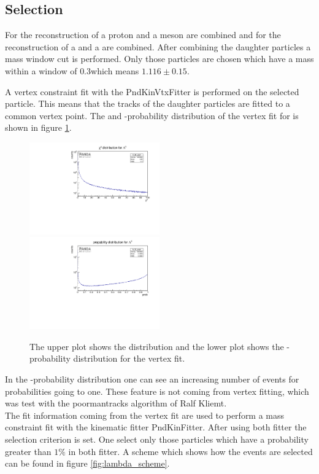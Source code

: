 	\subsection*{Selection}
		For the reconstruction of \lam a proton and a \piminus meson are combined and for the reconstruction of \alam a \antiproton and a \piplus are combined.		 
		After combining the daughter particles a mass window cut is performed.
		Only those particles are chosen which have a mass within a window of $0.3$\massunit which means $1.116\pm 0.15$\massunit.
		
		
		A vertex constraint fit with the PndKinVtxFitter is performed on the selected particle.
		This means that the tracks of the daughter particles are fitted to a common vertex point.  
		The \chisq and \chisq-probability distribution of the vertex fit for \lam is shown in figure \ref{fig:lambda_chi2}.
		
		\begin{figure}
			\centering
				\includegraphics[width=0.50\textwidth]{./plots/lambda0/lambda0_chi2.pdf}
				\includegraphics [width=0.50\textwidth]{./plots/lambda0/lambda0_prob.pdf}
			\caption{\propose The upper plot shows the  \chisq distribution and the lower plot shows the \chisq-probability distribution for the \lam vertex fit.}
			\label{fig:lambda_chi2}
		\end{figure}
		
		In the \chisq-probability distribution one can see an increasing number of events for probabilities going to one.
		These feature is not coming from vertex fitting, which was test with the poormantracks algorithm of Ralf Kliemt. 
		\vspace{11pt}\\
		The fit information coming from the vertex fit are used to perform a mass constraint fit with the kinematic fitter PndKinFitter.
		After using both fitter the selection criterion is set. 
		One select only those particles which have a probability greater than $1\%$ in both fitter.
		A scheme which shows how the events are selected can be found in figure \ref{fig:lambda_scheme}. 
		
